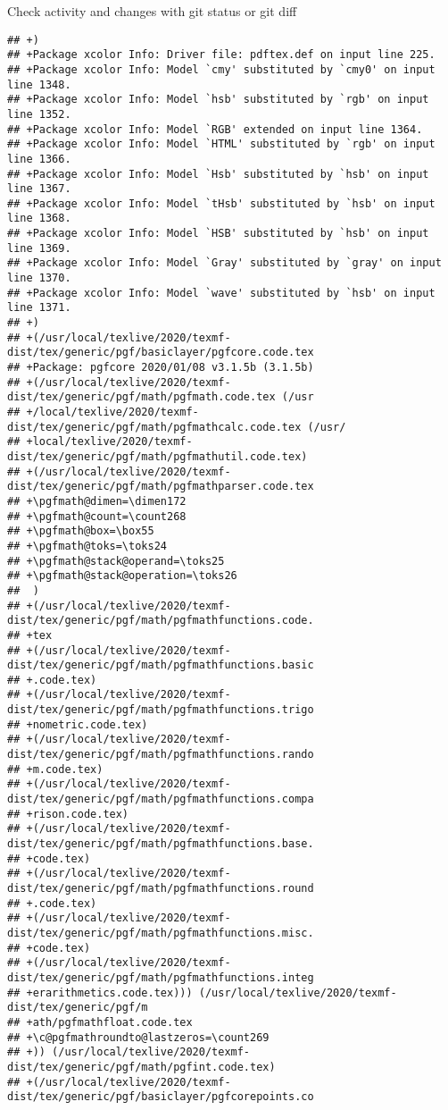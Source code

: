 \documentclass[ignorenonframetext,]{beamer}
\begin{document}
\begin{frame}[fragile]{Check activity and changes with git status or git
diff}
\begin{verbatim}
## +)
## +Package xcolor Info: Driver file: pdftex.def on input line 225.
## +Package xcolor Info: Model `cmy' substituted by `cmy0' on input line 1348.
## +Package xcolor Info: Model `hsb' substituted by `rgb' on input line 1352.
## +Package xcolor Info: Model `RGB' extended on input line 1364.
## +Package xcolor Info: Model `HTML' substituted by `rgb' on input line 1366.
## +Package xcolor Info: Model `Hsb' substituted by `hsb' on input line 1367.
## +Package xcolor Info: Model `tHsb' substituted by `hsb' on input line 1368.
## +Package xcolor Info: Model `HSB' substituted by `hsb' on input line 1369.
## +Package xcolor Info: Model `Gray' substituted by `gray' on input line 1370.
## +Package xcolor Info: Model `wave' substituted by `hsb' on input line 1371.
## +)
## +(/usr/local/texlive/2020/texmf-dist/tex/generic/pgf/basiclayer/pgfcore.code.tex
## +Package: pgfcore 2020/01/08 v3.1.5b (3.1.5b)
## +(/usr/local/texlive/2020/texmf-dist/tex/generic/pgf/math/pgfmath.code.tex (/usr
## +/local/texlive/2020/texmf-dist/tex/generic/pgf/math/pgfmathcalc.code.tex (/usr/
## +local/texlive/2020/texmf-dist/tex/generic/pgf/math/pgfmathutil.code.tex)
## +(/usr/local/texlive/2020/texmf-dist/tex/generic/pgf/math/pgfmathparser.code.tex
## +\pgfmath@dimen=\dimen172
## +\pgfmath@count=\count268
## +\pgfmath@box=\box55
## +\pgfmath@toks=\toks24
## +\pgfmath@stack@operand=\toks25
## +\pgfmath@stack@operation=\toks26
##  )
## +(/usr/local/texlive/2020/texmf-dist/tex/generic/pgf/math/pgfmathfunctions.code.
## +tex
## +(/usr/local/texlive/2020/texmf-dist/tex/generic/pgf/math/pgfmathfunctions.basic
## +.code.tex)
## +(/usr/local/texlive/2020/texmf-dist/tex/generic/pgf/math/pgfmathfunctions.trigo
## +nometric.code.tex)
## +(/usr/local/texlive/2020/texmf-dist/tex/generic/pgf/math/pgfmathfunctions.rando
## +m.code.tex)
## +(/usr/local/texlive/2020/texmf-dist/tex/generic/pgf/math/pgfmathfunctions.compa
## +rison.code.tex)
## +(/usr/local/texlive/2020/texmf-dist/tex/generic/pgf/math/pgfmathfunctions.base.
## +code.tex)
## +(/usr/local/texlive/2020/texmf-dist/tex/generic/pgf/math/pgfmathfunctions.round
## +.code.tex)
## +(/usr/local/texlive/2020/texmf-dist/tex/generic/pgf/math/pgfmathfunctions.misc.
## +code.tex)
## +(/usr/local/texlive/2020/texmf-dist/tex/generic/pgf/math/pgfmathfunctions.integ
## +erarithmetics.code.tex))) (/usr/local/texlive/2020/texmf-dist/tex/generic/pgf/m
## +ath/pgfmathfloat.code.tex
## +\c@pgfmathroundto@lastzeros=\count269
## +)) (/usr/local/texlive/2020/texmf-dist/tex/generic/pgf/math/pgfint.code.tex)
## +(/usr/local/texlive/2020/texmf-dist/tex/generic/pgf/basiclayer/pgfcorepoints.co

\end{verbatim}
\end{frame}
\end{document}
